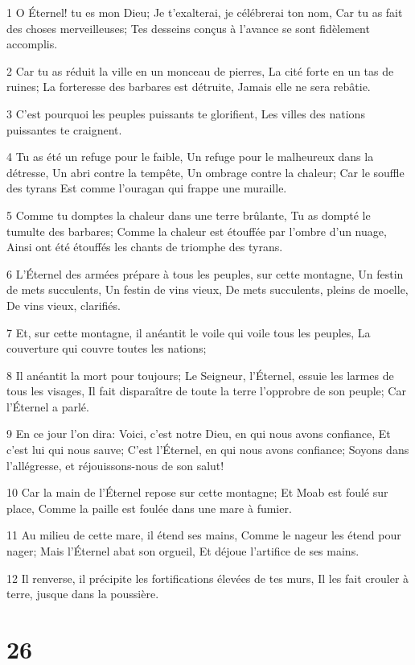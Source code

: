 \par 1 O Éternel! tu es mon Dieu; Je t'exalterai, je célébrerai ton nom, Car tu as fait des choses merveilleuses; Tes desseins conçus à l'avance se sont fidèlement accomplis.
\par 2 Car tu as réduit la ville en un monceau de pierres, La cité forte en un tas de ruines; La forteresse des barbares est détruite, Jamais elle ne sera rebâtie.
\par 3 C'est pourquoi les peuples puissants te glorifient, Les villes des nations puissantes te craignent.
\par 4 Tu as été un refuge pour le faible, Un refuge pour le malheureux dans la détresse, Un abri contre la tempête, Un ombrage contre la chaleur; Car le souffle des tyrans Est comme l'ouragan qui frappe une muraille.
\par 5 Comme tu domptes la chaleur dans une terre brûlante, Tu as dompté le tumulte des barbares; Comme la chaleur est étouffée par l'ombre d'un nuage, Ainsi ont été étouffés les chants de triomphe des tyrans.
\par 6 L'Éternel des armées prépare à tous les peuples, sur cette montagne, Un festin de mets succulents, Un festin de vins vieux, De mets succulents, pleins de moelle, De vins vieux, clarifiés.
\par 7 Et, sur cette montagne, il anéantit le voile qui voile tous les peuples, La couverture qui couvre toutes les nations;
\par 8 Il anéantit la mort pour toujours; Le Seigneur, l'Éternel, essuie les larmes de tous les visages, Il fait disparaître de toute la terre l'opprobre de son peuple; Car l'Éternel a parlé.
\par 9 En ce jour l'on dira: Voici, c'est notre Dieu, en qui nous avons confiance, Et c'est lui qui nous sauve; C'est l'Éternel, en qui nous avons confiance; Soyons dans l'allégresse, et réjouissons-nous de son salut!
\par 10 Car la main de l'Éternel repose sur cette montagne; Et Moab est foulé sur place, Comme la paille est foulée dans une mare à fumier.
\par 11 Au milieu de cette mare, il étend ses mains, Comme le nageur les étend pour nager; Mais l'Éternel abat son orgueil, Et déjoue l'artifice de ses mains.
\par 12 Il renverse, il précipite les fortifications élevées de tes murs, Il les fait crouler à terre, jusque dans la poussière.

\chapter{26}

